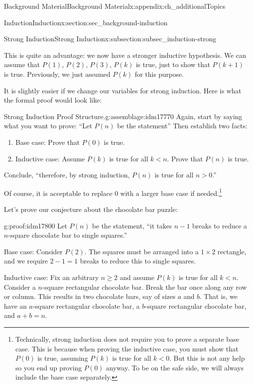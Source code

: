 \documentclass[oneside,10pt,]{book}
\numberwithin{equation}{chapter}
\newcommand{\lt}{<}
\newcommand{\gt}{>}
\begin{document}
\begin{appendixptx}{Background Material}{}{Background Material}{}{}{x:appendix:ch_additionalTopics}
\begin{sectionptx}{Induction}{}{Induction}{}{}{x:section:sec_background-induction}
\begin{subsectionptx}{Strong Induction}{}{Strong Induction}{}{}{x:subsection:subsec_induction-strong}
\par
This is quite an advantage: we now have a stronger inductive hypothesis. We can assume that \(P(1)\), \(P(2)\), \(P(3)\), \textellipsis{} \(P(k)\) is true, just to show that \(P(k+1)\) is true. Previously, we just assumed \(P(k)\) for this purpose.%
\par
It is slightly easier if we change our variables for strong induction. Here is what the formal proof would look like:%
\begin{assemblage}{Strong Induction Proof Structure.}{g:assemblage:idm17770}%
Again, start by saying what you want to prove: ``Let \(P(n)\) be the statement\textellipsis{}'' Then establish two facts:%
\begin{enumerate}
\item{}Base case: Prove that \(P(0)\) is true.%
\item{}Inductive case: Assume \(P(k)\) is true for all \(k \lt  n\). Prove that \(P(n)\) is true.%
\end{enumerate}
Conclude, ``therefore, by strong induction, \(P(n)\) is true for all \(n \gt 0\).''%
\end{assemblage}
Of course, it is acceptable to replace 0 with a larger base case if needed.\footnote{Technically, strong induction does not require you to prove a separate base case. This is because when proving the inductive case, you must show that \(P(0)\) is true, assuming \(P(k)\) is true for all \(k \lt  0\). But this is not any help so you end up proving \(P(0)\) anyway. To be on the safe side, we will always include the base case separately.\label{g:fn:idm17794}}%
\par
Let's prove our conjecture about the chocolate bar puzzle:%
\begin{proofptx}{}{g:proof:idm17800}
Let \(P(n)\) be the statement, ``it takes \(n-1\) breaks to reduce a \(n\)-square chocolate bar to single squares.''%
\par
Base case: Consider \(P(2)\). The squares must be arranged into a \(1\times 2\) rectangle, and we require \(2-1 = 1\) breaks to reduce this to single squares.%
\par
Inductive case: Fix an arbitrary \(n\ge 2\) and assume \(P(k)\) is true for all \(k \lt n\).  Consider a \(n\)-square rectangular chocolate bar.  Break the bar once along any row or column.  This results in two chocolate bars, say of sizes \(a\) and \(b\).  That is, we have an \(a\)-square rectangular chocolate bar, a \(b\)-square rectangular chocolate bar, and \(a+b = n\).%
\par

\end{proofptx}
\end{subsectionptx}
\end{sectionptx}
\end{appendixptx}
\end{document}
